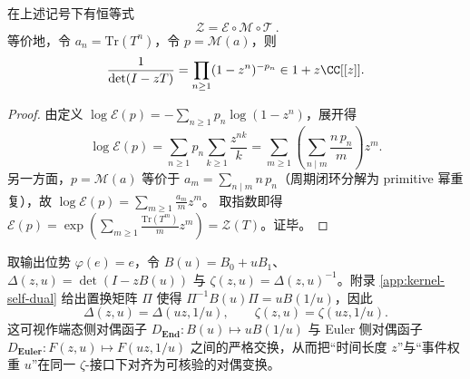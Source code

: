 \begin{proposition}\label{prop:time-space-commuting-diagram}
在上述记号下有恒等式
\[
\boxed{\ \mathcal{Z}=\mathcal{E}\circ\mathcal{M}\circ\mathcal{T}\ }.
\]
等价地，令 $a_n=\mathrm{Tr}(T^n)$，令 $p=\mathcal{M}(a)$，则
\[
\frac{1}{\det(I-zT)}=\prod_{n\ge 1}(1-z^n)^{-p_n}\in 1+z\CC[[z]].
\]
\end{proposition}

\begin{proof}
由定义 $\log\mathcal{E}(p)=-\sum_{n\ge 1}p_n\log(1-z^n)$，展开得
\[
\log\mathcal{E}(p)=\sum_{n\ge 1}p_n\sum_{k\ge 1}\frac{z^{nk}}{k}
=\sum_{m\ge 1}\left(\sum_{n\mid m}\frac{n\,p_n}{m}\right)z^m.
\]
另一方面，$p=\mathcal{M}(a)$ 等价于 $a_m=\sum_{n\mid m}n\,p_n$（周期闭环分解为 primitive 幂重复），故
\(
\log\mathcal{E}(p)=\sum_{m\ge 1}\frac{a_m}{m}z^m
\)。
取指数即得 $\mathcal{E}(p)=\exp(\sum_{m\ge 1}\frac{\mathrm{Tr}(T^m)}{m}z^m)=\mathcal{Z}(T)$。证毕。
\end{proof}

\begin{remark}[同步核的自对偶与二变量函数方程]
取输出位势 $\varphi(e)=e$，令 $B(u)=B_0+uB_1$、$\Delta(z,u)=\det(I-zB(u))$ 与 $\zeta(z,u)=\Delta(z,u)^{-1}$。附录 \ref{app:kernel-self-dual} 给出置换矩阵 $\Pi$ 使得 $\Pi^{-1}B(u)\Pi=uB(1/u)$，因此
\[
\Delta(z,u)=\Delta(uz,1/u),\qquad
\zeta(z,u)=\zeta(uz,1/u).
\]
这可视作端态侧对偶函子 $D_{\mathbf{End}}:B(u)\mapsto uB(1/u)$ 与 Euler 侧对偶函子 $D_{\mathbf{Euler}}:F(z,u)\mapsto F(uz,1/u)$ 之间的严格交换，从而把“时间长度 $z$”与“事件权重 $u$”在同一 $\zeta$-接口下对齐为可核验的对偶变换。
\end{remark}

